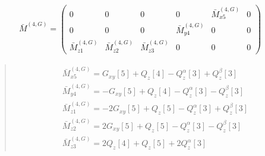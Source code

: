 \documentclass[fleqn,10pt]{jsarticle}
\begin{document}
\begin{align*}
\bar{M}^{(4,G)} = \begin{pmatrix} 0 & 0 & 0 & 0 & \bar{M}^{(4,G)}_{x5} & 0 \\ 0 & 0 & 0 & \bar{M}^{(4,G)}_{y4} & 0 & 0 \\ \bar{M}^{(4,G)}_{z1} & \bar{M}^{(4,G)}_{z2} & \bar{M}^{(4,G)}_{z3} & 0 & 0 & 0 \end{pmatrix}
\end{align*}
\begin{quote}
\begin{align*}
& \bar{M}^{(4,G)}_{x5} = G_{xy}[5] + Q_{z}[4] - Q_{z}^{\alpha}[3] + Q_{z}^{\beta}[3] \\
& \bar{M}^{(4,G)}_{y4} = - G_{xy}[5] + Q_{z}[4] - Q_{z}^{\alpha}[3] - Q_{z}^{\beta}[3] \\
& \bar{M}^{(4,G)}_{z1} = - 2 G_{xy}[5] + Q_{z}[5] - Q_{z}^{\alpha}[3] + Q_{z}^{\beta}[3] \\
& \bar{M}^{(4,G)}_{z2} = 2 G_{xy}[5] + Q_{z}[5] - Q_{z}^{\alpha}[3] - Q_{z}^{\beta}[3] \\
& \bar{M}^{(4,G)}_{z3} = 2 Q_{z}[4] + Q_{z}[5] + 2 Q_{z}^{\alpha}[3]
\end{align*}
\end{quote}
\end{document}
